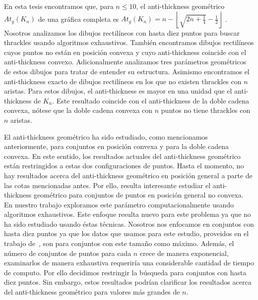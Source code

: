 En esta tesis encontramos que, para $n\leq 10$, el anti-thickness geométrico $At_g(K_n)$ de una gráfica
completa es $At_g(K_n) = n - \left\lfloor\sqrt{2n + \frac{1}{4}}- \frac{1}{2}\right\rfloor$ . Nosotros
analizamos los dibujos rectilíneos con hasta diez puntos para buscar thrackles usando
algoritmos exhaustivos. También encontramos dibujos rectilíneos cuyos puntos no están en posición convexa
y cuyo anti-thickness coincide con el anti-thickness convexo. Adicionalmente
analizamos tres parámetros geométricos de estos dibujos para tratar de entender su estructura. Asimismo
encontramos el anti-thickness exacto de dibujos rectilíneos en los que no existen thrackles con $n$
aristas. Para estos dibujos, el anti-thickness es mayor en una unidad que el anti-thickness de $K_n$. Este
resultado coincide con el anti-thickness de la doble cadena convexa, nótese que la doble cadena convexa con
$n$ puntos no tiene thrackles con $n$ aristas.

El anti-thickness geométrico ha sido estudiado, como mencionamos anteriormente, para conjuntos en posición
convexa y para la doble cadena convexa. En este sentido, los resultados actuales del
anti-thickness geométrico están restringidos a estas dos configuraciones de puntos. Hasta el momento, no
hay resultados acerca del anti-thickness geométrico en posición general a parte de las cotas mencionadas
antes. Por ello, resulta interesante estudiar el anti-thickness geométrico para conjuntos de puntos en
posición general no convexa. En nuestro trabajo exploramos este parámetro computacionalmente usando
algoritmos exhaustivos. Este enfoque resulta nuevo para este problema ya que no ha sido estudiado usando
éstas técnicas. Nosotros nos enfocamos en conjuntos con hasta diez puntos ya que los datos que usamos para
este estudio, proveidos en el trabajo de~\cite{Aichholzer2001}, son para conjuntos con este tamaño como
máximo. Además, el número de conjuntos de puntos para cada $n$ crece de manera exponencial, examinarlos de
manera exhaustiva requeriría una considerable cantidad de tiempo de computo. Por ello decidimos restringir
la búsqueda para conjuntos con hasta diez puntos. Sin embargo, estos resultados podrían clarificar los
resultados acerca del anti-thickness geométrico para valores más grandes de $n$.

